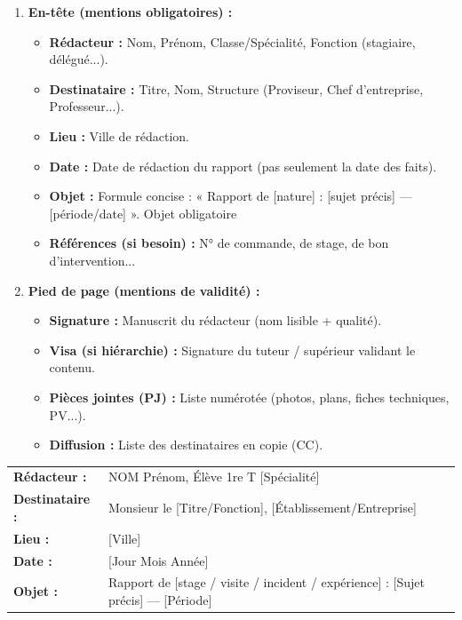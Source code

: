 \documentclass[11pt]{article}
\newcommand{\cle}[1]{{\popxbold\color{popdark}#1}}
\begin{document}
\begin{methode}
\begin{enumerate}
\item \textbf{En-tête (mentions obligatoires) :}
\begin{itemize}
\item \textbf{Rédacteur :} Nom, Prénom, Classe/Spécialité, Fonction (stagiaire, délégué...).
\item \textbf{Destinataire :} Titre, Nom, Structure (Proviseur, Chef d'entreprise, Professeur...).
\item \textbf{Lieu :} Ville de rédaction.
\item \textbf{Date :} Date de rédaction du rapport (pas seulement la date des faits).
\item \textbf{Objet :} Formule concise : « Rapport de [nature] : [sujet précis] — [période/date] ». \cle{Objet obligatoire}
\item \textbf{Références (si besoin) :} N° de commande, de stage, de bon d'intervention...
\end{itemize}
\item \textbf{Pied de page (mentions de validité) :}
\begin{itemize}
\item \textbf{Signature :} Manuscrit du rédacteur (nom lisible + qualité).
\item \textbf{Visa (si hiérarchie) :} Signature du tuteur / supérieur validant le contenu.
\item \textbf{Pièces jointes (PJ) :} Liste numérotée (photos, plans, fiches techniques, PV...).
\item \textbf{Diffusion :} Liste des destinataires en copie (CC).
\end{itemize}
\end{enumerate}
\end{methode}

\begin{exemplebox}
\begin{tabularx}{\linewidth}{lX}
\textbf{Rédacteur :} & NOM Prénom, Élève 1re T [Spécialité] \\
\textbf{Destinataire :} & Monsieur le [Titre/Fonction], [Établissement/Entreprise] \\
\textbf{Lieu :} & [Ville] \\
\textbf{Date :} & [Jour Mois Année] \\
\textbf{Objet :} & Rapport de [stage / visite / incident / expérience] : [Sujet précis] — [Période]
\end{tabularx}
\end{exemplebox}
\end{document}
